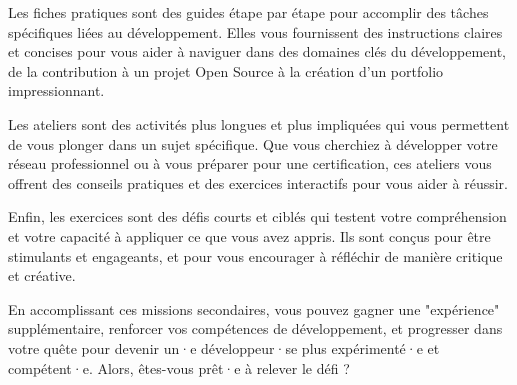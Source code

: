 Les fiches pratiques sont des guides étape par étape pour accomplir des tâches spécifiques liées au développement. Elles vous fournissent des instructions claires et concises pour vous aider à naviguer dans des domaines clés du développement, de la contribution à un projet Open Source à la création d'un portfolio impressionnant.

Les ateliers sont des activités plus longues et plus impliquées qui vous permettent de vous plonger dans un sujet spécifique. Que vous cherchiez à développer votre réseau professionnel ou à vous préparer pour une certification, ces ateliers vous offrent des conseils pratiques et des exercices interactifs pour vous aider à réussir.

Enfin, les exercices sont des défis courts et ciblés qui testent votre compréhension et votre capacité à appliquer ce que vous avez appris. Ils sont conçus pour être stimulants et engageants, et pour vous encourager à réfléchir de manière critique et créative.

En accomplissant ces missions secondaires, vous pouvez gagner une "expérience" supplémentaire, renforcer vos compétences de développement, et progresser dans votre quête pour devenir un·e développeur·se plus expérimenté·e et compétent·e. Alors, êtes-vous prêt·e à relever le défi ?




















